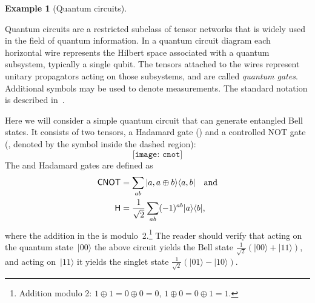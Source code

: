 \documentclass[aps,pra,12pt,nofootinbib,superscriptaddress,longbibliography]{revtex4-1}
\theoremstyle{plain}
\theoremstyle{definition}
\newtheorem{example}[theorem]{Example}
\newcommand{\ket}[1]{\mbox{$|#1\rangle$}}
\newcommand{\ketbra}[2]{\mbox{$|#1\rangle\langle #2|$}}
\newcommand{\cnot}{{\sf{CNOT}}}
\newcommand{\had}{{\sf{H}}}
\newcommand{\be}{\begin{equation}}
\newcommand{\ee}{\end{equation}}
\begin{document}
\begin{example}[Quantum circuits] \label{ex:circuits-1}

Quantum circuits are a restricted subclass of tensor networks that is widely used in the field of quantum information.
In a quantum circuit diagram each horizontal wire represents the Hilbert space associated with a quantum subsystem,
typically a single qubit.
The tensors attached to the wires represent unitary propagators acting on those subsystems, and are called \emph{quantum gates}.
Additional symbols may be used to denote measurements.
The standard notation is described in~\cite{PhysRevA.52.3457}.

Here we will consider a simple quantum circuit that can generate entangled Bell states.
It consists of two tensors, a Hadamard gate
(\had{})
and a controlled NOT gate
(\cnot, denoted by the symbol inside the dashed region):
\be
\label{eq:bell-circuit}
 \texttt{[image: cnot]}
\ee
The \cnot{} and Hadamard gates are defined as
\begin{align}
\cnot &= \sum_{ab} \ketbra{a, a \oplus b}{a,b} \quad \text{and}\\
\label{eqn:hadamard}
\had &= \frac{1}{\sqrt{2}} \sum_{ab} (-1)^{ab} \ketbra{a}{b},
\end{align}
where the addition in the \cnot{} is modulo~2.\footnote{Addition modulo 2: $1\oplus 1 = 0\oplus 0 = 0$, \; $1\oplus 0 = 0\oplus 1 = 1$.}
The reader should verify that acting on the quantum state~$\ket{00}$ the above circuit yields the Bell state
$\frac{1}{\sqrt{2}}(\ket{00}+\ket{11})$, and acting on~$\ket{11}$ it yields the singlet state
$\frac{1}{\sqrt{2}}(\ket{01}-\ket{10})$.
\end{example}
\end{document}
